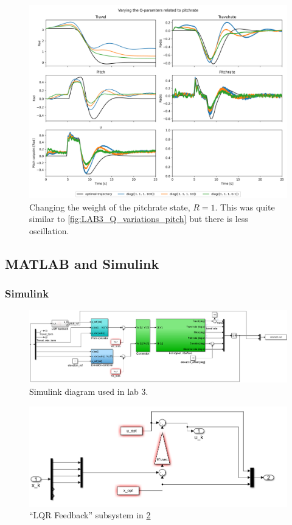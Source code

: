 \documentclass[../main.tex]{subfiles}
\begin{document}
\begin{figure}[h]
	\centering
	\includegraphics[width=0.8\linewidth]{figures/LAB3_Q_variations_pitchrate.png}
	\caption{Changing the weight of the pitchrate state, $R=1$. This was quite similar to \cref{fig:LAB3_Q_variations_pitch} but there is less oscillation.}
	\label{fig:LAB3_Q_variations_pitchrate}
\end{figure}


\clearpage

\subsection{MATLAB and Simulink}

\subsubsection{Simulink}
\begin{figure}[h]
	\centering
	\includegraphics[width=1\linewidth, keepaspectratio]{code/lab3_simulink_1}
	\caption{Simulink diagram used in lab 3.}
	\label{fig:lab3_simulink}
\end{figure}
\begin{figure}[h]
	\centering
	\includegraphics[width=1\linewidth, keepaspectratio]{code/lab3_simulink_2}
	\caption{``LQR Feedback'' subsystem in \cref{fig:lab3_simulink}}
	\label{fig:lab3_simulink_lqr}
\end{figure}
\end{document}
